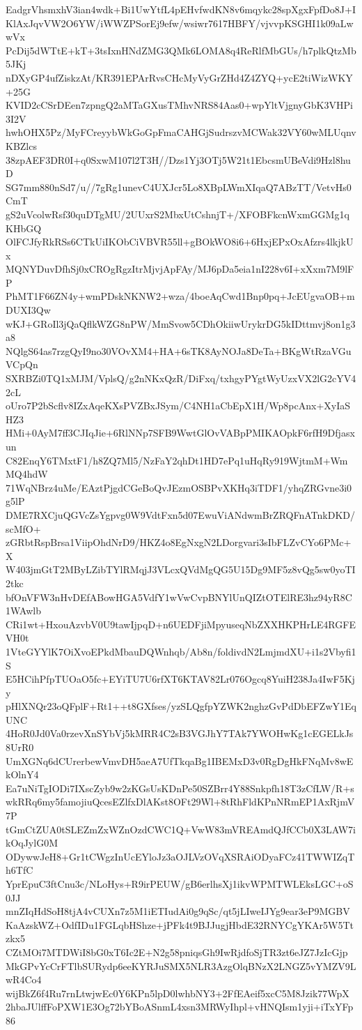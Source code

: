 EadgrVhsmxhV3ian4wdk+Bi1UwYtfL4pEHvfwdKN8v6mqykc28spXgxFpfDo8J+I
KlAxJqvVW2O6YW/iWWZPSorEj9efw/wsiwr7617HBFY/vjvvpKSGHI1k09aLwwVx
PcDij5dWTtE+kT+3tsIxnHNdZMG3QMk6LOMA8q4ReRlfMbGUs/h7plkQtzMb5JKj
nDXyGP4ufZiskzAt/KR391EPArRvsCHcMyVyGrZHd4Z4ZYQ+ycE2tiWizWKY+25G
KVID2cCSrDEen7zpngQ2aMTaGXusTMhvNRS84Aas0+wpYltVjgnyGbK3VHPi3I2V
hwhOHX5Pz/MyFCreyybWkGoGpFmaCAHGjSudrszvMCWak32VY60wMLUqnvKBZlcs
38zpAEF3DR0I+q0SxwM107l2T3H//Dzs1Yj3OTj5W21t1EbcsmUBeVdi9Hzl8huD
SG7mm880nSd7/u//7gRg1unevC4UXJcr5Lo8XBpLWmXIqaQ7ABzTT/VetvHs0CmT
gS2uVcolwRsf30quDTgMU/2UUxrS2MbxUtCshnjT+/XFOBFkcnWxmGGMg1qKHbGQ
OlFCJfyRkRSs6CTkUiIKObCiVBVR55ll+gBOkWO8i6+6HxjEPxOxAfzrs4lkjkUx
MQNYDuvDfhSj0xCROgRgzItrMjvjApFAy/MJ6pDa5eia1nI228v6I+xXxm7M9lFP
PhMT1F66ZN4y+wmPDskNKNW2+wza/4boeAqCwd1Bnp0pq+JcEUgvaOB+mDUXI3Qw
wKJ+GRoIl3jQaQflkWZG8nPW/MmSvow5CDhOkiiwUrykrDG5kIDttmvj8on1g3a8
NQlgS64as7rzgQyI9no30VOvXM4+HA+6sTK8AyNOJa8DeTa+BKgWtRzaVGuVCpQn
SXRBZi0TQ1xMJM/VplsQ/g2nNKxQzR/DiFxq/txhgyPYgtWyUzxVX2lG2cYV42cL
oUro7P2bScflv8IZxAqeKXsPVZBxJSym/C4NH1aCbEpX1H/Wp8pcAnx+XyIaSHZ3
HMi+0AyM7ff3CJIqJie+6RlNNp7SFB9WwtGlOvVABpPMIKAOpkF6rfH9Dfjasxun
C82EnqY6TMxtF1/h8ZQ7Ml5/NzFaY2qhDt1HD7ePq1uHqRy919WjtmM+WmMQ4hdW
71WqNBrz4uMe/EAztPjgdCGeBoQvJEzmOSBPvXKHq3iTDF1/yhqZRGvne3i0g5lP
DME7RXCjuQGVcZsYgpvg0W9VdtFxn5d07EwuViANdwmBrZRQFnATnkDKD/scMfO+
zGRbtRspBrsa1ViipOhdNrD9/HKZ4o8EgNxgN2LDorgvari3sIbFLZvCYo6PMc+X
W403jmGtT2MByLZibTYlRMqjJ3VLcxQVdMgQG5U15Dg9MF5z8vQg5sw0yoTI2tkc
bfOnVFW3nHvDEfABowHGA5VdfY1wVwCvpBNYlUnQIZtOTElRE3hz94yR8C1WAwlb
CRi1wt+HxouAzvbV0U9tawIjpqD+n6UEDFjiMpyuseqNbZXXHKPHrLE4RGFEVH0t
1VteGYYlK7OiXvoEPkdMbauDQWnhqb/Ab8n/foldivdN2LmjmdXU+i1s2Vbyfi1S
E5HCihPfpTUOaO5fc+EYiTU7U6rfXT6KTAV82Lr076Ogcq8YuiH238Ja4IwF5Kjy
pHlXNQr23oQFplF+Rt1++t8GXfses/yzSLQgfpYZWK2nghzGvPdDbEFZwY1EqUNC
4HoR0Jd0Va0rzevXnSYbVj5kMRR4C2sB3VGJhY7TAk7YWOHwKg1cEGELkJs8UrR0
UmXGNq6dCUrerbewVmvDH5aeA7UfTkqaBg1IBEMxD3v0RgDgHkFNqMv8wEkOlnY4
Ea7uNiTgIODi7IXscZyb9w2zKGsUsKDnPe50SZBrr4Y88Snkpfh18T3zCfLW/R+s
wkRRq6my5famojiuQcesEZlfxDlAKst8OFt29Wl+8tRhFldKPnNRmEP1AxRjmV7P
tGmCtZUA0tSLEZmZxWZnOzdCWC1Q+VwW83mVREAmdQJfCCb0X3LAW7ikOqJylG0M
ODywwJeH8+Gr1tCWgzInUcEYloJz3aOJLVzOVqXSRAiODyaFCz41TWWIZqTh6TfC
YprEpuC3ftCnu3c/NLoHys+R9irPEUW/gB6erlhsXj1ikvWPMTWLEksLGC+oS0JJ
mnZIqHdSoH8tjA4vCUXn7z5M1iETIudAi0g9qSc/qt5jLIweIJYg9ear3eP9MGBV
KaAzskWZ+OdfIDu1FGLqbHShze+jPFk4t9BJJugjHbdE32RNYCgYKAr5W5Ttzkx5
CZtMOi7MTDWiI8bG0xT6Ic2E+N2g58pniqsGh9IwRjdfoSjTR3zt6eJZ7JzIcGjp
MkGPvYcCrFTlbSURydp6eeKYRJuSMX5NLR3AzgOlqBNzX2LNGZ5vYMZV9LwR4Co4
wijBkZ6f4Ru7rnLtwjwEc0Y6KPn5lpD0lwhbNY3+2FfEAeif5xcC5M8Jzik77WpX
2hbaJUlffFoPXW1E3Og72bYBoASnmL4xsn3MRWyIhpl+vHNQIsm1yji+iTxYFp86
